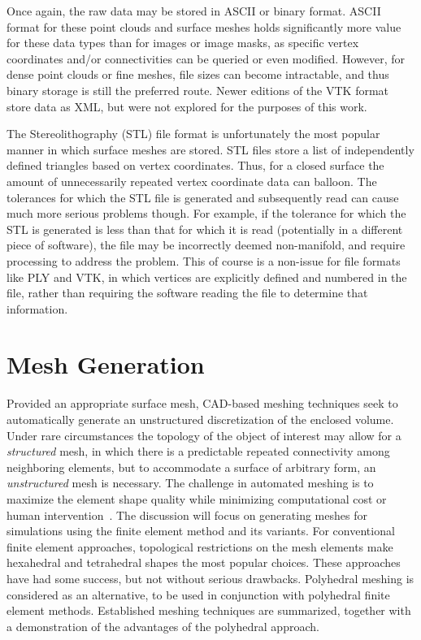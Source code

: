 Once again, the raw data may be stored in ASCII or binary format. ASCII format for these point clouds and surface meshes holds significantly more value for these data types than for images or image masks, as specific vertex coordinates and/or connectivities can be queried or even modified. However, for dense point clouds or fine meshes, file sizes can become intractable, and thus binary storage is still the preferred route. Newer editions of the VTK format store data as XML, but were not explored for the purposes of this work.

The Stereolithography (STL) file format is unfortunately the most popular manner in which surface meshes are stored. STL files store a list of independently defined triangles based on vertex coordinates. Thus, for a closed surface the amount of unnecessarily repeated vertex coordinate data can balloon. The tolerances for which the STL file is generated and subsequently read can cause much more serious problems though. For example, if the tolerance for which the STL is generated is less than that for which it is read (potentially in a different piece of software), the file may be incorrectly deemed non-manifold, and require processing to address the problem. This of course is a non-issue for file formats like PLY and VTK, in which vertices are explicitly defined and numbered in the file, rather than requiring the software reading the file to determine that information.

\section{Mesh Generation}
%
Provided an appropriate surface mesh, CAD-based meshing techniques seek to automatically generate an unstructured discretization of the enclosed volume. Under rare circumstances the topology of the object of interest may allow for a \textit{structured} mesh, in which there is a predictable repeated connectivity among neighboring elements, but to accommodate a surface of arbitrary form, an \textit{unstructured} mesh is necessary. The challenge in automated meshing is to maximize the element shape quality while minimizing computational cost or human intervention~\cite{blacker_2001}. The discussion will focus on generating meshes for simulations using the finite element method and its variants. For conventional finite element approaches, topological restrictions on the mesh elements make hexahedral and tetrahedral shapes the most popular choices. These approaches have had some success, but not without serious drawbacks. Polyhedral meshing is considered as an alternative, to be used in conjunction with polyhedral finite element methods. Established meshing techniques are summarized, together with a demonstration of the advantages of the polyhedral approach.

